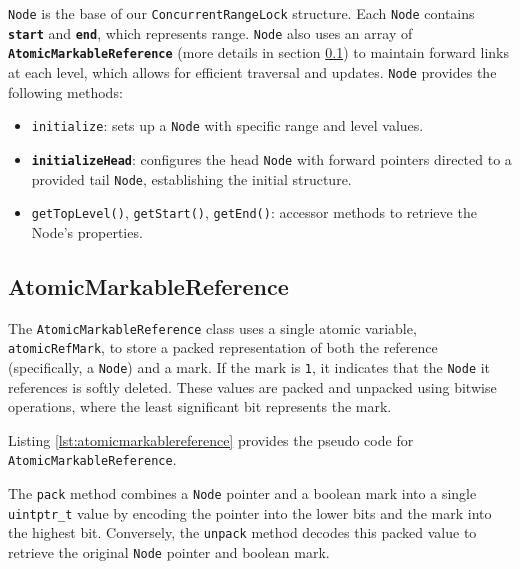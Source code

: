 \texttt{Node} is the base of our \texttt{ConcurrentRangeLock} structure.
Each \texttt{Node} contains \textbf{\texttt{start}} and \textbf{\texttt{end}}, which represents range.
\texttt{Node} also uses an array of \textbf{\texttt{AtomicMarkableReference}} (more details in section \ref{subsec:atomicmarkablereference}) to maintain forward links at each level, which allows for efficient traversal and updates. 
\texttt{Node} provides the following methods:

\begin{itemize}
    \item \texttt{initialize}: sets up a \texttt{Node} with specific range and level values.
    \item \textbf{\texttt{initializeHead}}: configures the head \texttt{Node} with forward pointers directed to a provided tail \texttt{Node}, establishing the initial structure.
    \item \texttt{getTopLevel()}, \texttt{getStart()}, \texttt{getEnd()}: accessor methods to retrieve the Node's properties.
\end{itemize}

\begin{figure}[h]
    \centering
    
\end{figure}

\clearpage

\subsection{AtomicMarkableReference} \label{subsec:atomicmarkablereference}

The \texttt{AtomicMarkableReference} class uses a single atomic variable, \texttt{atomicRefMark}, to store a packed representation of both the reference (specifically, a \texttt{Node}) and a mark. If the mark is \texttt{1}, it indicates that the \texttt{Node} it references is softly deleted. These values are packed and unpacked using bitwise operations, where the least significant bit represents the mark.

Listing \ref{lst:atomicmarkablereference} provides the pseudo code for \texttt{AtomicMarkableReference}.

The \texttt{pack} method combines a \texttt{Node} pointer and a boolean mark into a single \texttt{uintptr\_t} value by encoding the pointer into the lower bits and the mark into the highest bit. Conversely, the \texttt{unpack} method decodes this packed value to retrieve the original \texttt{Node} pointer and boolean mark.


